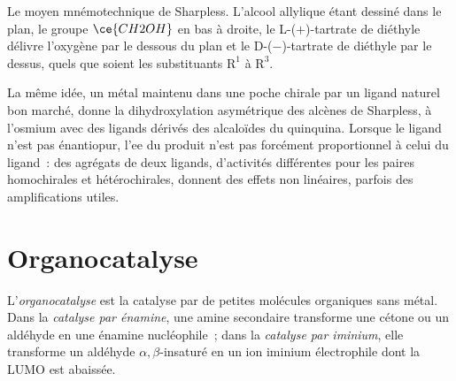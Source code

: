 \begin{omfigure}

{\small Le moyen mnémotechnique de Sharpless. L'alcool allylique étant
dessiné dans le plan, le groupe
$\ce{CH2OH}$ en bas à droite, le L-($+$)-tartrate de diéthyle délivre l'oxygène par
le dessous du plan et le D-($-$)-tartrate de diéthyle par le dessus, quels que soient les
substituants $\mathrm R^1$ à $\mathrm R^3$.}
\end{omfigure}

La même idée, un métal maintenu dans une poche chirale par un ligand
naturel bon marché, donne la dihydroxylation asymétrique des alcènes de
Sharpless, à l'osmium avec des ligands dérivés des alcaloïdes du
quinquina. Lorsque le ligand n'est pas énantiopur, l'ee du produit n'est
pas forcément proportionnel à celui du ligand~: des agrégats de deux
ligands, d'activités différentes pour les paires homochirales et
hétérochirales, donnent des effets non linéaires, parfois des
amplifications utiles.

\section{Organocatalyse}

\begin{definition}[Organocatalyse]\label{def:b3:asymmetric-synthesis:organocatalysis}
L'\emph{organocatalyse} est la catalyse par de
petites molécules organiques sans métal. Dans la \emph{catalyse par énamine}, une
amine secondaire transforme une cétone ou un aldéhyde en une énamine
nucléophile~; dans la \emph{catalyse par iminium}, elle transforme un aldéhyde $\alpha,\beta$-insaturé
en un ion iminium électrophile dont la LUMO est abaissée.
\end{definition}

